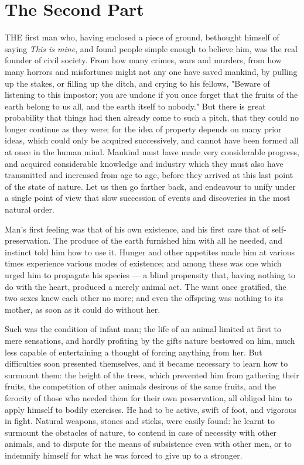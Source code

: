 \documentclass[12pt]{report}
\newcommand{\mychapter}[2]{
\setcounter{chapter}{#1}
    \setcounter{section}{0}
    \chapter*{#2}
    \addcontentsline{toc}{section}{#2}
}
\begin{document}
\mychapter{4}{The Second Part}
THE first man who, having enclosed a piece of ground, bethought himself of saying \emph{This is mine}, and found people simple enough to believe him, was the real founder of civil society. From how many crimes, wars and murders, from how many horrors and misfortunes might not any one have saved mankind, by pulling up the stakes, or filling up the ditch, and crying to his fellows, "Beware of listening to this impostor; you are undone if you once forget that the fruits of the earth belong to us all, and the earth itself to nobody." But there is great probability that things had then already come to such a pitch, that they could no longer continue as they were; for the idea of property depends on many prior ideas, which could only be acquired successively, and cannot have been formed all at once in the human mind. Mankind must have made very considerable progress, and acquired considerable knowledge and industry which they must also have transmitted and increased from age to age, before they arrived at this last point of the state of nature. Let us then go farther back, and endeavour to unify under a single point of view that slow succession of events and discoveries in the most natural order.

Man's first feeling was that of his own existence, and his first care that of self-preservation. The produce of the earth furnished him with all he needed, and instinct told him how to use it. Hunger and other appetites made him at various times experience various modes of existence; and among these was one which urged him to propagate his species — a blind propensity that, having nothing to do with the heart, produced a merely animal act. The want once gratified, the two sexes knew each other no more; and even the offspring was nothing to its mother, as soon as it could do without her.

Such was the condition of infant man; the life of an animal limited at first to mere sensations, and hardly profiting by the gifts nature bestowed on him, much less capable of entertaining a thought of forcing anything from her. But difficulties soon presented themselves, and it became necessary to learn how to surmount them: the height of the trees, which prevented him from gathering their fruits, the competition of other animals desirous of the same fruits, and the ferocity of those who needed them for their own preservation, all obliged him to apply himself to bodily exercises. He had to be active, swift of foot, and vigorous in fight. Natural weapons, stones and sticks, were easily found: he learnt to surmount the obstacles of nature, to contend in case of necessity with other animals, and to dispute for the means of subsistence even with other men, or to indemnify himself for what he was forced to give up to a stronger.
\end{document}
